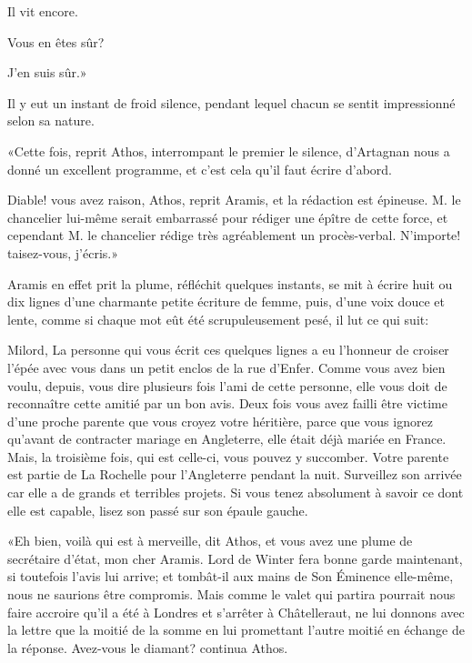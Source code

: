 \speak  Il vit encore. 

\speak  Vous en êtes sûr? 

\speak  J'en suis sûr.» 

Il y eut un instant de froid silence, pendant lequel chacun se sentit impressionné selon sa nature. 

«Cette fois, reprit Athos, interrompant le premier le silence, d'Artagnan nous a donné un excellent programme, et c'est cela qu'il faut écrire d'abord. 

\speak  Diable! vous avez raison, Athos, reprit Aramis, et la rédaction est épineuse. M. le chancelier lui-même serait embarrassé pour rédiger une épître de cette force, et cependant M. le chancelier rédige très agréablement un procès-verbal. N'importe! taisez-vous, j'écris.» 

Aramis en effet prit la plume, réfléchit quelques instants, se mit à écrire huit ou dix lignes d'une charmante petite écriture de femme, puis, d'une voix douce et lente, comme si chaque mot eût été scrupuleusement pesé, il lut ce qui suit: 
\begin{mail}{}{Milord,}
La personne qui vous écrit ces quelques lignes a eu l'honneur de croiser l'épée avec vous dans un petit enclos de la rue d'Enfer. Comme vous avez bien voulu, depuis, vous dire plusieurs fois l'ami de cette personne, elle vous doit de reconnaître cette amitié par un bon avis. Deux fois vous avez failli être victime d'une proche parente que vous croyez votre héritière, parce que vous ignorez qu'avant de contracter mariage en Angleterre, elle était déjà mariée en France. Mais, la troisième fois, qui est celle-ci, vous pouvez y succomber. Votre parente est partie de La Rochelle pour l'Angleterre pendant la nuit. Surveillez son arrivée car elle a de grands et terribles projets. Si vous tenez absolument à savoir ce dont elle est capable, lisez son passé sur son épaule gauche.
\end{mail}

«Eh bien, voilà qui est à merveille, dit Athos, et vous avez une plume de secrétaire d'état, mon cher Aramis. Lord de Winter fera bonne garde maintenant, si toutefois l'avis lui arrive; et tombât-il aux mains de Son Éminence elle-même, nous ne saurions être compromis. Mais comme le valet qui partira pourrait nous faire accroire qu'il a été à Londres et s'arrêter à Châtelleraut, ne lui donnons avec la lettre que la moitié de la somme en lui promettant l'autre moitié en échange de la réponse. Avez-vous le diamant? continua Athos. 


